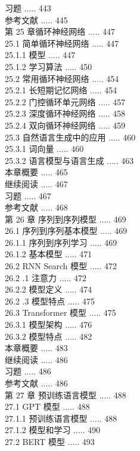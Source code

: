 \documentclass[10pt]{article}
\begin{document}
\begin{CJK*}{UTF8}{bsmi}
习题 ..... 443\\
参考文献 ..... 445\\
第 25 章循环神经网络 ..... 447\\
25.1 简单循环神经网络 ..... 447\\
25.1.1 模型 ..... 447\\
25.1.2 学习算法 ..... 450\\
25.2 常用循环神经网络 ..... 454\\
25.2.1 长短期记忆网络 ..... 454\\
25.2.2 门控循环单元网络 ..... 457\\
25.2.3 深度循环神经网络 ..... 458\\
25.2.4 双向循环神经网络 ..... 459\\
25.3 自然语言生成中的应用 ..... 460\\
25.3.1 词向量 ..... 460\\
25.3.2 语言模型与语言生成 ..... 463\\
本章概要 ..... 465\\
继续阅读 ..... 467\\
习题 ..... 467\\
参考文献 ..... 468\\
第 26 章 序列到序列模型 ..... 469\\
26.1 序列到序列基本模型 ..... 469\\
26.1.1 序列到序列学习 ..... 469\\
26.1.2 基本模型 ..... 471\\
26.2 RNN Search 模型 ..... 472\\
26.2 .1 注意力 ..... 472\\
26.2.2 模型定义 ..... 474\\
26.2 .3 模型特点 ..... 475\\
26.3 Transformer 模型 ..... 475\\
26.3.1 模型架构 ..... 476\\
26.3.2 模型特点 ..... 482\\
本章概要 ..... 483\\
继续阅读 ..... 486\\
习题 ..... 486\\
参考文献 ..... 486\\
第 27 章 预训练语言模型 ..... 488\\
27.1 GPT 模型 ..... 488\\
27.1.1 预训练语言模型 ..... 488\\
27.1.2 模型和学习 ..... 490\\
27.2 BERT 模型 ..... 493\\

\end{CJK*}
\end{document}

